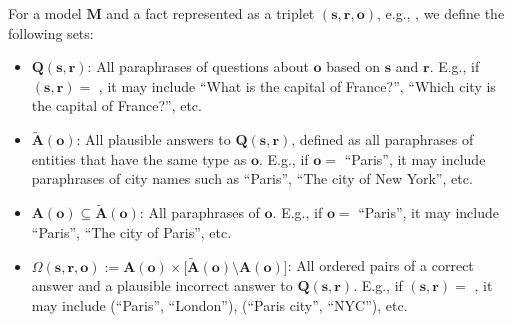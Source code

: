 \vspace{-5pt}
\begin{definition}
\label{def:knowledge_degree}

For a model $\mathbf{M}$ and a fact 
represented as a 
\emph{}
triplet \(\mathbf{(s,r,o)}\), e.g., \emph{}, we define the following sets:


\begin{itemize}
    \item $\mathbf{Q(s,r)}$: All paraphrases of questions about $\mathbf{o}$ based on $\mathbf{s}$ and $\mathbf{r}$.  
    E.g., if $\mathbf{(s,r)} = $ \emph{}, it may include {\small{``What is the capital of France?''}}, {\small{``Which city is the capital of France?''}}, etc.  
     
    \item $\mathbf{\tilde{A}(o)}$: All plausible answers to \(\mathbf{Q(s,r)}\), defined as all paraphrases of entities that have the same type as $\mathbf{o}$. E.g., if \(\mathbf{o}=\)  {\small{``Paris''}},
    it may include paraphrases of city names such as {\small{``Paris''}}, {\small{``The city of New York''}}, etc.

    \item $\mathbf{A(o)} \subseteq \mathbf{\tilde{A}(o)}$: All paraphrases of $\mathbf{o}$. E.g., if \(\mathbf{o}=\)  {\small{``Paris''}}, it may include {\small{``Paris''}}, {\small{``The city of Paris''}}, etc.  

    \item $\Omega(\mathbf{s,r,o}):=\mathbf{A(o)} \times \bigl[\mathbf{\tilde{A}(o)} \setminus \mathbf{A(o)}\bigr]$: All ordered pairs of a correct answer and a plausible incorrect answer to $\mathbf{Q(s,r)}$. E.g., if $\mathbf{(s,r)} = $ \emph{}, it may include {\small{(``Paris'', ``London'')}}, {\small{(``Paris city'', ``NYC'')}}, etc.

    

\end{itemize}




\end{definition}

